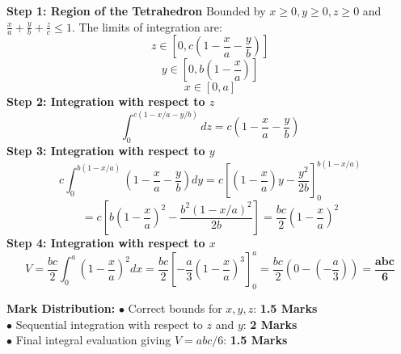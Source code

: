 \begin{solutionbox}
\textbf{Step 1: Region of the Tetrahedron}
Bounded by $x \ge 0, y \ge 0, z \ge 0$ and $\frac{x}{a} + \frac{y}{b} + \frac{z}{c} \le 1$.
The limits of integration are:
\[
z \in \left[0, c\left(1 - \frac{x}{a} - \frac{y}{b}\right)\right]
\]
\[
y \in \left[0, b\left(1 - \frac{x}{a}\right)\right]
\]
\[
x \in [0, a]
\]
\textbf{Step 2: Integration with respect to $z$}
\[
\int_0^{c(1 - x/a - y/b)} dz = c\left(1 - \frac{x}{a} - \frac{y}{b}\right)
\]
\textbf{Step 3: Integration with respect to $y$}
\[
c \int_0^{b(1 - x/a)} \left(1 - \frac{x}{a} - \frac{y}{b}\right) dy = c \left[ \left(1 - \frac{x}{a}\right)y - \frac{y^2}{2b} \right]_0^{b(1 - x/a)}
\]
\[
= c \left[ b\left(1 - \frac{x}{a}\right)^2 - \frac{b^2(1 - x/a)^2}{2b} \right] = \frac{bc}{2}\left(1 - \frac{x}{a}\right)^2
\]
\textbf{Step 4: Integration with respect to $x$}
\[
V = \frac{bc}{2} \int_0^a \left(1 - \frac{x}{a}\right)^2 dx = \frac{bc}{2} \left[ -\frac{a}{3}\left(1 - \frac{x}{a}\right)^3 \right]_0^a = \frac{bc}{2}\left(0 - \left(-\frac{a}{3}\right)\right) = \mathbf{\frac{abc}{6}}
\]

\begin{markingrubric}
\textbf{Mark Distribution:}
$\bullet$ Correct bounds for $x, y, z$: \textbf{1.5 Marks}\\
$\bullet$ Sequential integration with respect to $z$ and $y$: \textbf{2 Marks}\\
$\bullet$ Final integral evaluation giving $V = abc/6$: \textbf{1.5 Marks}
\end{markingrubric}
\end{solutionbox}

\newpage
